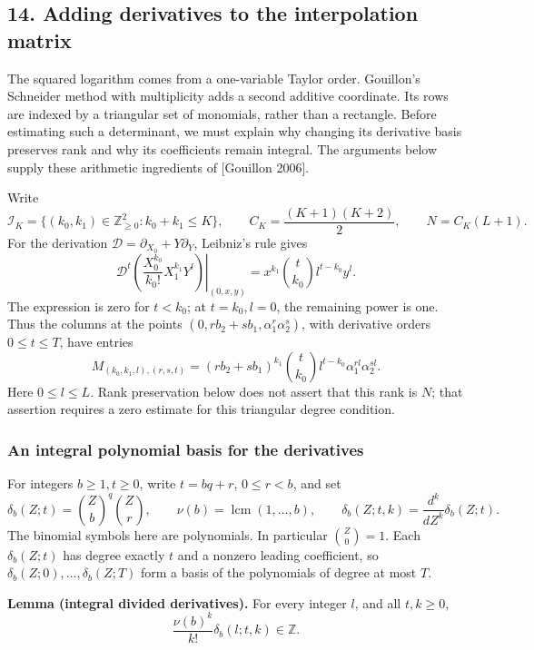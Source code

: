 \documentclass[
  11pt,
  a4paper,
]{article}
\begin{document}
\subsection{14. Adding derivatives to the interpolation
matrix}\label{adding-derivatives-to-the-interpolation-matrix}

The squared logarithm comes from a one-variable Taylor order. Gouillon's
Schneider method with multiplicity adds a second additive coordinate.
Its rows are indexed by a triangular set of monomials, rather than a
rectangle. Before estimating such a determinant, we must explain why
changing its derivative basis preserves rank and why its coefficients
remain integral. The arguments below supply these arithmetic ingredients
of {[}Gouillon 2006{]}.

Write \[
\mathcal I_K=\{(k_0,k_1)\in\mathbb Z_{\ge0}^2:k_0+k_1\le K\},\qquad
C_K=\frac{(K+1)(K+2)}2,\qquad N=C_K(L+1).
\] For the derivation \(\mathcal D=\partial_{X_0}+Y\partial_Y\),
Leibniz's rule gives \[
\left.\mathcal D^t\left(\frac{X_0^{k_0}}{k_0!}X_1^{k_1}Y^l\right)
\right|_{(0,x,y)}
=x^{k_1}\binom t{k_0}l^{t-k_0}y^l. \tag{7.37}
\] The expression is zero for \(t<k_0\); at \(t=k_0,l=0\), the remaining
power is one. Thus the columns at the points
\((0,rb_2+sb_1,\alpha_1^r\alpha_2^s)\), with derivative orders
\(0\le t\le T\), have entries \[
M_{(k_0,k_1,l),(r,s,t)}
=(rb_2+sb_1)^{k_1}\binom t{k_0}l^{t-k_0}
\alpha_1^{rl}\alpha_2^{sl}.
\] Here \(0\le l\le L\). Rank preservation below does not assert that
this rank is \(N\); that assertion requires a zero estimate for this
triangular degree condition.

\subsubsection{An integral polynomial basis for the
derivatives}\label{an-integral-polynomial-basis-for-the-derivatives}

For integers \(b\ge1,t\ge0\), write \(t=bq+r\), \(0\le r<b\), and set \[
\delta_b(Z;t)=\binom Zb^{q}\binom Zr,\qquad
\nu(b)=\operatorname{lcm}(1,\ldots,b),\qquad
\delta_b(Z;t,k)=\frac{d^k}{dZ^k}\delta_b(Z;t).
\] The binomial symbols here are polynomials. In particular
\(\binom Z0=1\). Each \(\delta_b(Z;t)\) has degree exactly \(t\) and a
nonzero leading coefficient, so \(\delta_b(Z;0),\ldots,\delta_b(Z;T)\)
form a basis of the polynomials of degree at most \(T\).

\textbf{Lemma (integral divided derivatives).} For every integer \(l\),
and all \(t,k\ge0\), \[
\frac{\nu(b)^k}{k!}\delta_b(l;t,k)\in\mathbb Z. \tag{7.38}
\]
\end{document}
